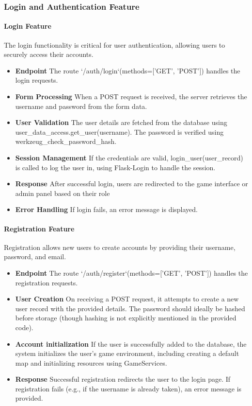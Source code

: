 \documentclass[12pt]{article}
\begin{document}
\subsubsection{Login and Authentication Feature}
\paragraph{Login Feature}
The login functionality is critical for user authentication, allowing users to securely access their accounts.
\begin{itemize}
    \item \textbf{Endpoint} The route `/auth/login`(methods=['GET', 'POST']) handles the login requests.
    \item \textbf{Form Processing} When a POST request is received, the server retrieves the username and password from the form data.
    \item \textbf{User Validation} The user details are fetched from the database using user\_data\_access.get\_user(username). The password is verified using werkzeug\_check\_password\_hash.
    \item \textbf{Session Management}  If the credentials are valid, login\_user(user\_record) is called to log the user in, using Flask-Login to handle the session.
    \item \textbf{Response} After successful login, users are redirected to the game interface or admin panel based on their role
    \item \textbf{Error Handling} If login fails, an error message is displayed.
\end{itemize}
\paragraph{Registration Feature}
Registration allows new users to create accounts by providing their username, password, and email.
\begin{itemize}
    \item \textbf{Endpoint} The route `/auth/register`(methods=['GET', 'POST']) handles the registration requests.
    \item \textbf{User Creation} On receiving a POST request, it attempts to create a new user record with the provided details. The password should ideally be hashed before storage (though hashing is not explicitly mentioned in the provided code).
    \item \textbf{Account initialization} If the user is successfully added to the database, the system initializes the user's game environment, including creating a default map and initializing resources using GameServices.
    \item \textbf{Response} Successful registration redirects the user to the login page. If registration fails (e.g., if the username is already taken), an error message is provided.
\end{itemize}
\end{document}
